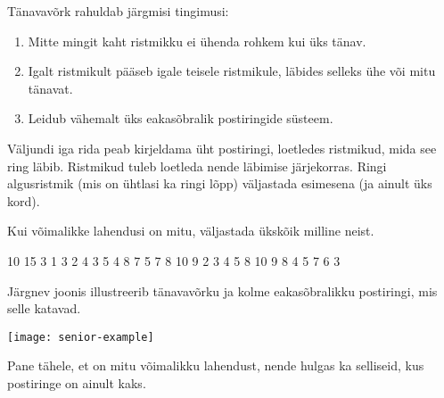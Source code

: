 \documentclass{boi2014-et}
\begin{document}
    Tänavavõrk rahuldab järgmisi tingimusi:
    \begin{enumerate}
        \item Mitte mingit kaht ristmikku ei ühenda rohkem kui üks tänav.
        \item Igalt ristmikult pääseb igale teisele ristmikule,
            läbides selleks ühe või mitu tänavat.
        \item Leidub vähemalt üks eakasõbralik postiringide süsteem.
    \end{enumerate}

    \Output

    Väljundi iga rida peab kirjeldama üht postiringi, loetledes ristmikud,
    mida see ring läbib. Ristmikud tuleb loetleda nende läbimise järjekorras.
    Ringi algusristmik (mis on ühtlasi ka ringi lõpp) väljastada esimesena
    (ja ainult üks kord).

    Kui võimalikke lahendusi on mitu, väljastada ükskõik milline neist.

    \Example

    \example
    {
        10 15  3  1 3  2 4  3 5  4 8  7  5 7  8  10  9
    }
    {
        2 3 4 5 8 10 9  8 4  5 7 6 3
    }
    {
        Järgnev joonis illustreerib tänavavõrku ja kolme eakasõbralikku
        postiringi, mis selle katavad.

        \texttt{[image: senior-example]}

        Pane tähele, et on mitu võimalikku lahendust, nende hulgas ka
        selliseid, kus postiringe on ainult kaks.
    }
\end{document}
